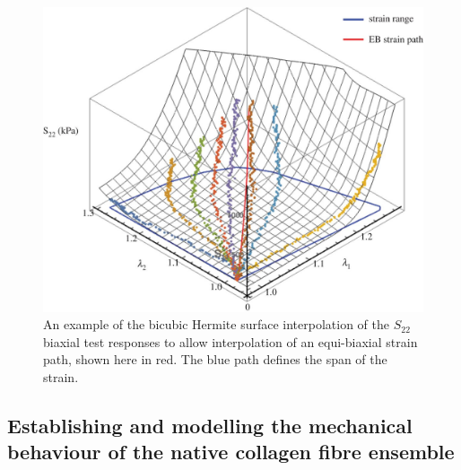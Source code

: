     
\begin{figure}
\centering
\includegraphics[width=\textwidth]{Images/chapter3/F4large.jpg}
\caption{An example of the bicubic Hermite surface interpolation of the $S_{22}$ biaxial test responses to allow interpolation of an equi-biaxial strain path, shown here in red. The blue path defines the span of the strain.}
\label{c3:fig:4}
\end{figure}
    


\subsection{Establishing and modelling the mechanical behaviour of the native collagen fibre ensemble}
    
